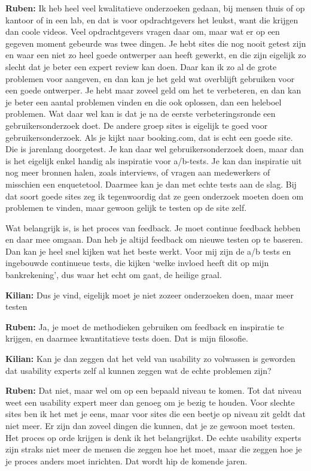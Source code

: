 \textbf{Ruben:} Ik heb heel veel kwalitatieve onderzoeken gedaan, bij mensen thuis of op kantoor of in een lab, en dat is voor opdrachtgevers het leukst, want die krijgen dan coole videos. Veel opdrachtgevers vragen daar om, maar wat er op een gegeven moment gebeurde was twee dingen. Je hebt sites die nog nooit getest zijn en waar een niet zo heel goede ontwerper aan heeft gewerkt, en die zijn eigelijk zo slecht dat je beter een expert review kan doen. Daar kan ik zo al de grote problemen voor aangeven, en dan kan je het geld wat overblijft gebruiken voor een goede ontwerper. Je hebt maar zoveel geld om het te verbeteren, en dan kan je beter een aantal problemen vinden en die ook oplossen, dan een heleboel problemen. Wat daar wel kan is dat je na de eerste verbeteringsronde een gebruikersonderzoek doet. De andere groep sites is eigelijk te goed voor gebruikersonderzoek. Als je kijkt naar booking.com, dat is echt een goede site. Die is jarenlang doorgetest. Je kan daar wel gebruikersonderzoek doen, maar dan is het eigelijk enkel handig als inspiratie voor a/b-tests. Je kan dan inspiratie uit nog meer bronnen halen, zoals interviews, of vragen aan medewerkers of misschien een enquetetool. Daarmee kan je dan met echte tests aan de slag. Bij dat soort goede sites zeg ik tegenwoordig dat ze geen onderzoek moeten doen om problemen te vinden, maar gewoon gelijk te testen op de site zelf.

Wat belangrijk is, is het proces van feedback. Je moet continue feedback hebben en daar mee omgaan. Dan heb je altijd feedback om nieuwe testen op te baseren. Dan kan je heel snel kijken wat het beste werkt. Voor mij zijn de a/b tests en ingebouwde continueue tests, die kijken `welke invloed heeft dit op mijn bankrekening', dus waar het echt om gaat, de heilige graal.

\textbf{Kilian:} Dus je vind, eigelijk moet je niet zozeer onderzoeken doen, maar meer testen

\textbf{Ruben:} Ja, je moet de methodieken gebruiken om feedback en inspiratie te krijgen, en daarmee kwantitatieve tests doen. Dat is mijn filosofie.

\textbf{Kilian:} Kan je dan zeggen dat het veld van usability zo volwassen is geworden dat usability experts zelf al kunnen zeggen wat de echte problemen zijn?

\textbf{Ruben:} Dat niet, maar wel om op een bepaald niveau te komen. Tot dat niveau weet een usability expert meer dan genoeg om je bezig te houden. Voor slechte sites ben ik het met je eens, maar voor sites die een beetje op niveau zit geldt dat niet meer. Er zijn dan zoveel dingen die kunnen, dat je ze gewoon moet testen. Het proces op orde krijgen is denk ik het belangrijkst. De echte usability experts zijn straks niet meer de mensen die zeggen hoe het moet, maar die zeggen hoe je je proces anders moet inrichten. Dat wordt hip de komende jaren.

